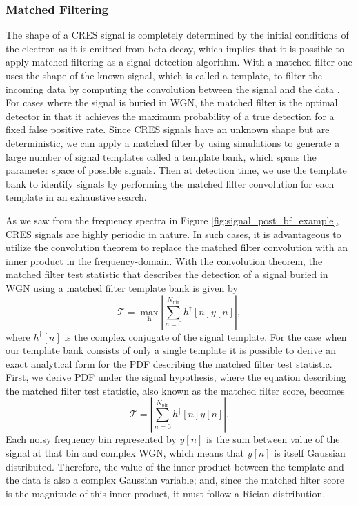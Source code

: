 \subsubsection{Matched Filtering}

The shape of a CRES signal is completely determined by the initial conditions of the electron as it is emitted from beta-decay, which implies that it is possible to apply matched filtering as a signal detection algorithm. With a matched filter one uses the shape of the known signal, which is called a template, to filter the incoming data by computing the convolution between the signal and the data \cite{detection_theory}. For cases where the signal is buried in WGN, the matched filter is the optimal detector in that it achieves the maximum probability of a true detection for a fixed false positive rate. Since CRES signals have an unknown shape but are deterministic, we can apply a matched filter by using simulations to generate a large number of signal templates called a template bank, which spans the parameter space of possible signals. Then at detection time, we use the template bank to identify signals by performing the matched filter convolution for each template in an exhaustive search.

As we saw from the frequency spectra in Figure \ref{fig:signal_post_bf_example}, CRES signals are highly periodic in nature. In such cases, it is advantageous to utilize the convolution theorem to replace the matched filter convolution with an inner product in the frequency-domain. With the convolution theorem, the matched filter test statistic that describes the detection of a signal buried in WGN using a matched filter template bank is given by
\begin{equation}
    \mathcal{T}=\max_{\mathbf{h}}\left|\sum_{n=0}^{N_\mathrm{bin}}h^\dagger[n]y[n]\right|,
    \label{eq:mf_test_stat}
\end{equation}
where $h^\dagger[n]$ is the complex conjugate of the signal template. For the case when our template bank consists of only a single template it is possible to derive an exact analytical form for the PDF describing the matched filter test statistic. First, we derive PDF under the signal hypothesis, where the equation describing the matched filter test statistic, also known as the matched filter score, becomes
\begin{equation}
    \mathcal{T}=\left|\sum_{n=0}^{N_\mathrm{bin}}h^\dagger[n]y[n]\right|.
    \label{eq:mf_inner_prod_1}
\end{equation}
Each noisy frequency bin represented by $y[n]$ is the sum between value of the signal at that bin and complex WGN, which means that $y[n]$ is itself Gaussian distributed. Therefore, the value of the inner product between the template and the data is also a complex Gaussian variable; and, since the matched filter score is the magnitude of this inner product, it must follow a Rician distribution.

